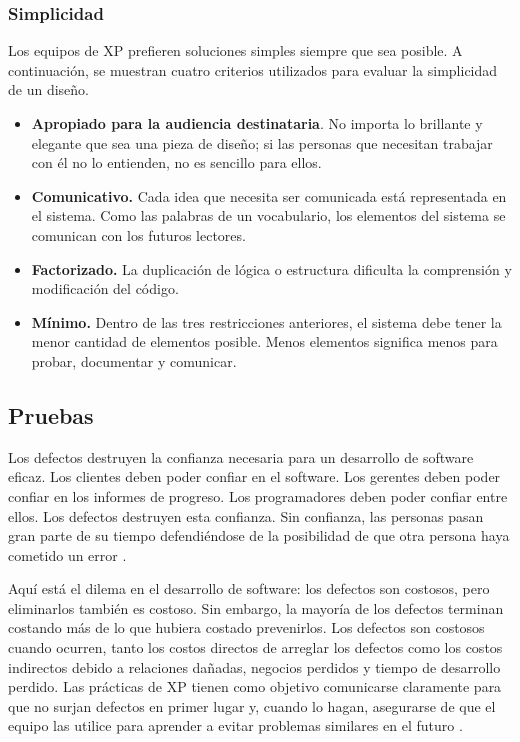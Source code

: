 \begin{spacing}{1.5}
				\subsubsection{Simplicidad}
				Los equipos de XP prefieren soluciones simples siempre que sea posible. A continuación, se muestran cuatro criterios utilizados para evaluar la simplicidad de un diseño.
					\begin{itemize}
						\item \textbf{Apropiado para la audiencia destinataria}. No importa lo brillante y elegante que sea una pieza de diseño; si las personas que necesitan trabajar con él no lo entienden, no es sencillo para ellos.
						\item\textbf{Comunicativo.} Cada idea que necesita ser comunicada está representada en el sistema. Como las palabras de un vocabulario, los elementos del sistema se comunican con los futuros lectores.
 						\item \textbf{Factorizado.} La duplicación de lógica o estructura dificulta la comprensión y modificación del código.
						\item \textbf{Mínimo.} Dentro de las tres restricciones anteriores, el sistema debe tener la menor cantidad de elementos posible. Menos elementos significa menos para probar, documentar y comunicar.
					\end{itemize}
					
	\subsection{Pruebas}
				Los defectos destruyen la confianza necesaria para un desarrollo de software eficaz. Los clientes deben poder confiar en el software. Los gerentes deben poder confiar en los informes de progreso. Los programadores deben poder confiar entre ellos. Los defectos destruyen esta confianza. Sin confianza, las personas pasan gran parte de su tiempo defendiéndose de la posibilidad de que otra persona haya cometido un error \cite{chap2_extreme_programming}.
				
				Aquí está el dilema en el desarrollo de software: los defectos son costosos, pero eliminarlos también es costoso. Sin embargo, la mayoría de los defectos terminan costando más de lo que hubiera costado prevenirlos. Los defectos son costosos cuando ocurren, tanto los costos directos de arreglar los defectos como los costos indirectos debido a relaciones dañadas, negocios perdidos y tiempo de desarrollo perdido. Las prácticas de XP tienen como objetivo comunicarse claramente para que no surjan defectos en primer lugar y, cuando lo hagan, asegurarse de que el equipo las utilice para aprender a evitar problemas similares en el futuro \cite{chap2_extreme_programming}.
				

\end{spacing}
